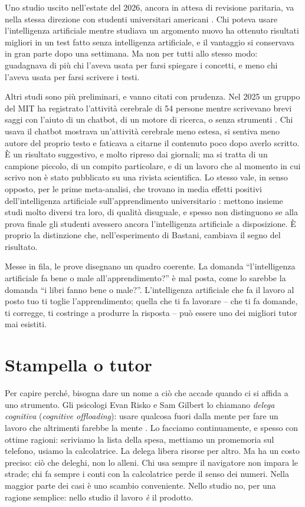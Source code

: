 Uno studio uscito nell'estate del 2026, ancora in attesa di revisione
paritaria, va nella stessa direzione con studenti universitari
americani \parencite{contractor2026}. Chi poteva usare l'intelligenza
artificiale mentre studiava un argomento nuovo ha ottenuto risultati
migliori in un test fatto senza intelligenza artificiale, e il vantaggio
si conservava in gran parte dopo una settimana. Ma non per tutti allo
stesso modo: guadagnava di più chi l'aveva usata per farsi spiegare i
concetti, e meno chi l'aveva usata per farsi scrivere i testi.

Altri studi sono più preliminari, e vanno citati con prudenza. Nel
2025 un gruppo del MIT ha registrato l'attività cerebrale di 54
persone mentre scrivevano brevi saggi con l'aiuto di un chatbot, di un
motore di ricerca, o senza strumenti \parencite{kosmyna2025}. Chi
usava il chatbot mostrava un'attività cerebrale meno estesa, si sentiva
meno autore del proprio testo e faticava a citarne il contenuto poco
dopo averlo scritto. È un risultato suggestivo, e molto ripreso dai
giornali; ma si tratta di un campione piccolo, di un compito
particolare, e di un lavoro che al momento in cui scrivo non è stato
pubblicato su una rivista scientifica. Lo stesso vale, in senso
opposto, per le prime meta-analisi, che trovano in media effetti
positivi dell'intelligenza artificiale sull'apprendimento universitario
\parencite{liu2026}: mettono insieme studi molto diversi tra loro, di
qualità disuguale, e spesso non distinguono se alla prova finale gli
studenti avessero ancora l'intelligenza artificiale a disposizione. È
proprio la distinzione che, nell'esperimento di Bastani, cambiava il
segno del risultato.

Messe in fila, le prove disegnano un quadro coerente. La domanda
\enquote{l'intelligenza artificiale fa bene o male all'apprendimento?}
è mal posta, come lo sarebbe la domanda \enquote{i libri fanno bene o
male?}. L'intelligenza artificiale che fa il lavoro al posto tuo ti
toglie l'apprendimento; quella che ti fa lavorare -- che ti fa domande,
ti corregge, ti costringe a produrre la risposta -- può essere uno dei
migliori tutor mai esistiti.

\section{Stampella o tutor}

Per capire perché, bisogna dare un nome a ciò che accade quando ci si
affida a uno strumento. Gli psicologi Evan Risko e Sam Gilbert lo
chiamano \emph{delega cognitiva} (\emph{cognitive offloading}): usare
qualcosa fuori dalla mente per fare un lavoro che altrimenti farebbe la
mente \parencite{risko2016}. Lo facciamo continuamente, e spesso con
ottime ragioni: scriviamo la lista della spesa, mettiamo un promemoria
sul telefono, usiamo la calcolatrice. La delega libera risorse per
altro. Ma ha un costo preciso: ciò che deleghi, non lo alleni. Chi usa
sempre il navigatore non impara le strade; chi fa sempre i conti con
la calcolatrice perde il senso dei numeri. Nella maggior parte dei casi
è uno scambio conveniente. Nello studio no, per una ragione semplice:
nello studio il lavoro \emph{è} il prodotto.

